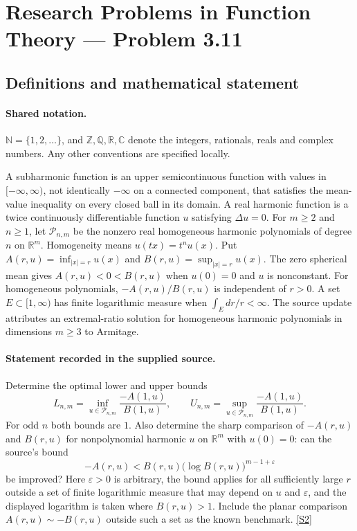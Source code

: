 \documentclass[11pt]{article}
\newcommand{\sref}[2]{\hyperlink{source:#1:#2}{[S#2]}}
\begin{document}
\section{Research Problems in Function Theory — Problem 3.11}\label{statement}

\subsection{Definitions and mathematical statement}

\paragraph{Shared notation.}$\mathbb N=\{1,2,\ldots\}$, and $\mathbb Z,\mathbb Q,\mathbb R,\mathbb C$ denote the integers, rationals, reals and complex numbers. Any other conventions are specified locally.


A subharmonic function is an upper semicontinuous function with values in $[-\infty,\infty)$, not identically $-\infty$ on a connected component, that satisfies the mean-value inequality on every closed ball in its domain. A real harmonic function is a twice continuously differentiable function $u$ satisfying $\Delta u=0$. For $m\geq2$ and $n\geq1$, let $\mathcal P_{n,m}$ be the nonzero real homogeneous harmonic polynomials of degree $n$ on $\mathbb R^m$. Homogeneity means $u(tx)=t^n u(x)$. Put $A(r,u)=\inf_{|x|=r}u(x)$ and $B(r,u)=\sup_{|x|=r}u(x)$. The zero spherical mean gives $A(r,u)<0<B(r,u)$ when $u(0)=0$ and $u$ is nonconstant. For homogeneous polynomials, $-A(r,u)/B(r,u)$ is independent of $r>0$. A set $E\subset[1,\infty)$ has finite logarithmic measure when $\int_E dr/r<\infty$.
The source update attributes an extremal-ratio solution for homogeneous harmonic polynomials in dimensions $m\geq3$ to Armitage.
\paragraph{Statement recorded in the supplied source.}
Determine the optimal lower and upper bounds
\[L_{n,m}=\inf_{u\in\mathcal P_{n,m}}\frac{-A(1,u)}{B(1,u)},\qquad
U_{n,m}=\sup_{u\in\mathcal P_{n,m}}\frac{-A(1,u)}{B(1,u)}.\]
For odd $n$ both bounds are $1$. Also determine the sharp comparison of $-A(r,u)$ and $B(r,u)$ for nonpolynomial harmonic $u$ on $\mathbb R^m$ with $u(0)=0$: can the source's bound
\[-A(r,u)<B(r,u)\bigl(\log B(r,u)\bigr)^{m-1+\varepsilon}\]
be improved? Here $\varepsilon>0$ is arbitrary, the bound applies for all sufficiently large $r$ outside a set of finite logarithmic measure that may depend on $u$ and $\varepsilon$, and the displayed logarithm is taken where $B(r,u)>1$. Include the planar comparison $A(r,u)\sim-B(r,u)$ outside such a set as the known benchmark. \sref{statement}{2}
\end{document}
